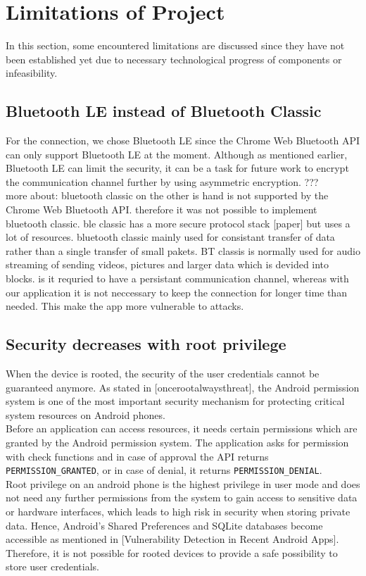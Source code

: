 \section{Limitations of Project}
\label{limitations}


In this section, some encountered limitations are discussed since they have not been established yet due to necessary technological progress of components or infeasibility. \\

\subsection{Bluetooth LE instead of Bluetooth Classic}
For the connection, we chose Bluetooth LE since the Chrome Web Bluetooth API can only support Bluetooth LE at the moment. Although as mentioned earlier, Bluetooth LE  can limit the security, it can be a task for future work to encrypt the communication channel further by using asymmetric encryption. ??? \\

more about: bluetooth classic on the other is hand is not supported by the Chrome Web Bluetooth API. therefore it was not possible to implement bluetooth classic. ble classic has a more secure protocol stack [paper] but uses a lot of resources. bluetooth classic mainly used for consistant transfer of data rather than a single transfer of small pakets. BT classis is normally used for audio streaming of sending videos, pictures and larger data which is devided into blocks. is it requried to have a persistant communication channel, whereas with our application it is not neccessary to keep the connection for longer time than needed. This make the app more vulnerable to attacks.

\subsection{Security decreases with root privilege}
When the device is rooted, the security of the user credentials cannot be guaranteed anymore. As stated in [oncerootalwaysthreat], the Android permission system is one of the most important security mechanism for protecting critical system resources on Android phones. \\
Before an application can access resources, it needs certain permissions which are granted by the Android permission system. The application asks for permission with check functions and in case of approval the API returns \texttt{PERMISSION\_GRANTED}, or in case of denial, it returns \texttt{PERMISSION\_DENIAL}. \\
Root privilege on an android phone is the highest privilege in user mode and does not need any further permissions from the system to gain access to sensitive data or hardware interfaces, which leads to high risk in security when storing private data. Hence, Android's Shared Preferences and SQLite databases become accessible as mentioned in [Vulnerability Detection in Recent Android Apps]. Therefore, it is not possible for rooted devices to provide a safe possibility to store user credentials. \\
